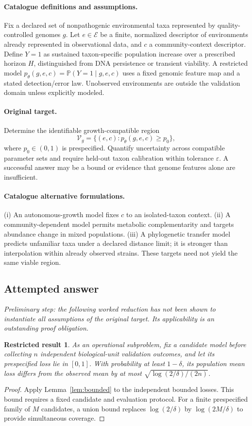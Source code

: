 \documentclass[11pt]{article}
\newcommand{\Prob}{\mathbb P}
\providecommand{\Prob}{\mathbb P}
\newtheorem{attemptresult}{Restricted result}[section]
\begin{document}
\paragraph{Catalogue definitions and assumptions.}
Fix a declared set of nonpathogenic environmental taxa represented by quality-controlled genomes $g$. Let $e\in\mathcal E$ be a finite, normalized descriptor of environments already represented in observational data, and $c$ a community-context descriptor. Define $Y=1$ as sustained taxon-specific population increase over a prescribed horizon $H$, distinguished from DNA persistence or transient viability. A restricted model $p_\theta(g,e,c)=\Prob(Y=1\mid g,e,c)$ uses a fixed genomic feature map and a stated detection/error law. Unobserved environments are outside the validation domain unless explicitly modeled.
\paragraph{Original target.}
Determine the identifiable growth-compatible region
    \[\mathcal V_g=\{(e,c):p_\theta(g,e,c)\geq p_0\},\]
    where $p_0\in(0,1)$ is prespecified. Quantify uncertainty across compatible parameter sets and require held-out taxon calibration within tolerance $\varepsilon$. A successful answer may be a bound or evidence that genome features alone are insufficient.
\paragraph{Catalogue alternative formulations.}
(i) An autonomous-growth model fixes $c$ to an isolated-taxon context. (ii) A community-dependent model permits metabolic complementarity and targets abundance change in mixed populations. (iii) A phylogenetic transfer model predicts unfamiliar taxa under a declared distance limit; it is stronger than interpolation within already observed strains. These targets need not yield the same viable region.
\subsection{Attempted answer}
\noindent\emph{Preliminary step: the following worked reduction has not been shown to instantiate all assumptions of the original target. Its applicability is an outstanding proof obligation.}

\begin{attemptresult}
As an operational subproblem, fix a candidate model before collecting $n$ independent biological-unit validation outcomes, and let its prespecified loss lie in $[0,1]$. With probability at least $1-\delta$, its population mean loss differs from the observed mean by at most $\sqrt{\log(2/\delta)/(2n)}$.
\end{attemptresult}
\begin{proof}
Apply Lemma~\ref{lem:bounded} to the independent bounded losses. This bound requires a fixed candidate and evaluation protocol. For a finite prespecified family of $M$ candidates, a union bound replaces $\log(2/\delta)$ by $\log(2M/\delta)$ to provide simultaneous coverage.
\end{proof}
\end{document}
